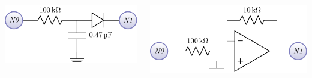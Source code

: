 \documentclass[25pt, a0paper, landscape, fleqn]{tikzposter}
\begin{document}
\begin{columns}
{  \begin{minipage}[b]{0.15\pagewidth}
    \begin{tikzfigure}
      \centering
      \includegraphics{./Figures/RCCoupler/RCCoupler.pdf}
    \end{tikzfigure}
  \end{minipage}
  \begin{minipage}[b]{0.15\pagewidth}
    \begin{tikzfigure}
      \centering
      \includegraphics{./Figures/NegativeCoupling/NegativeCoupling.pdf}
    \end{tikzfigure}
  \end{minipage}



  }




\end{columns}
\end{document}
